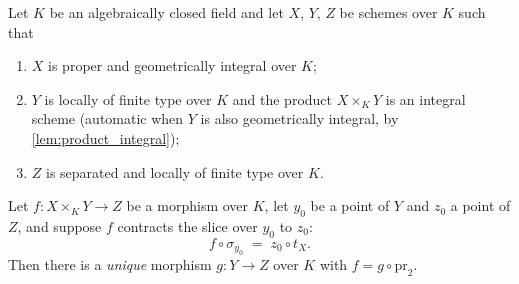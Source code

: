 \begin{theorem}[Rigidity]
  \label{thm:rigidity}
  \leanok
  Let \(K\) be an algebraically closed field and let \(X\), \(Y\), \(Z\) be schemes over
  \(K\) such that
  \begin{enumerate}
    \item \(X\) is proper and geometrically integral over \(K\);
    \item \(Y\) is locally of finite type over \(K\) and the product \(X \times_K Y\) is an
      integral scheme (automatic when \(Y\) is also geometrically integral, by
      \ref{lem:product_integral});
    \item \(Z\) is separated and locally of finite type over \(K\).
  \end{enumerate}
  Let \(f : X \times_K Y \to Z\) be a morphism over \(K\), let \(y_0\) be a point of \(Y\)
  and \(z_0\) a point of \(Z\), and suppose \(f\) contracts the slice over \(y_0\) to
  \(z_0\):
  \[
    f \circ \sigma_{y_0} \;=\; z_0 \circ t_X .
  \]
  Then there is a \emph{unique} morphism \(g : Y \to Z\) over \(K\) with
  \(f = g \circ \mathrm{pr}_2\).
\end{theorem}
